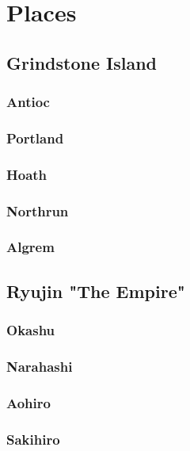 \section{Places}

	\subsection{Grindstone Island}

		\subsubsection{Antioc}

		\subsubsection{Portland}

		\subsubsection{Hoath}
	
		\subsubsection{Northrun}
	
		\subsubsection{Algrem}

	\subsection{Ryujin "The Empire"}

		\subsubsection{Okashu}

		\subsubsection{Narahashi}

		\subsubsection{Aohiro}
	
		\subsubsection{Sakihiro}
	
